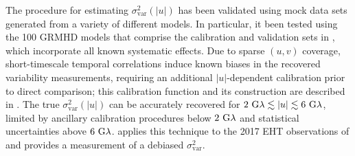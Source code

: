 The procedure for estimating $\sigma_\text{var}^2 (|u|)$ has been validated using mock data sets generated from a variety of different models.  In particular, it been tested using the 100 GRMHD models that comprise the calibration and validation sets in , which incorporate all known systematic effects.  Due to sparse $(u,v)$ coverage, short-timescale temporal correlations induce known biases in the recovered variability measurements, requiring an additional $|u|$-dependent calibration prior to direct comparison; this calibration function and its construction are described in \citealt{NoiseModeling}.  The true $\sigma_\text{var}^2 (|u|)$ can be accurately recovered for $2~{\rm G}\lambda\lesssim|u|\lesssim6~{\rm G}\lambda$, limited by ancillary calibration procedures below $2~{\rm G}\lambda$ and statistical uncertainties above $6~{\rm G}\lambda$.   applies this technique to the 2017 EHT observations of \sgra and provides a measurement of a debiased $\sigma_\text{var}^2$.



